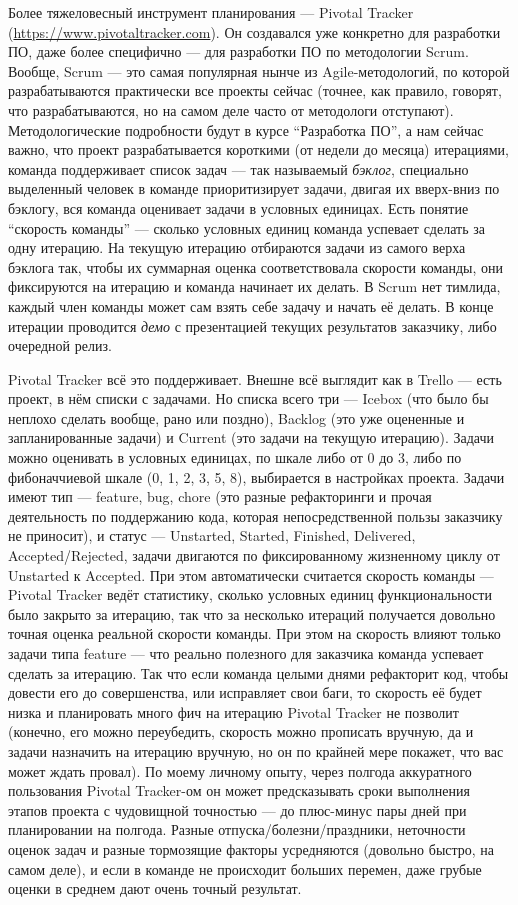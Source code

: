 \documentclass[a5paper]{article}
\begin{document}
Более тяжеловесный инструмент планирования --- Pivotal Tracker (\url{https://www.pivotaltracker.com}). Он создавался уже конкретно для разработки ПО, даже более специфично --- для разработки ПО по методологии Scrum. Вообще, Scrum --- это самая популярная нынче из Agile-методологий, по которой разрабатываются практически все проекты сейчас (точнее, как правило, говорят, что разрабатываются, но на самом деле часто от методологи отступают). Методологические подробности будут в курсе ``Разработка ПО'', а нам сейчас важно, что проект разрабатывается короткими (от недели до месяца) итерациями, команда поддерживает список задач --- так называемый \textit{бэклог}, специально выделенный человек в команде приоритизирует задачи, двигая их вверх-вниз по бэклогу, вся команда оценивает задачи в условных единицах. Есть понятие ``скорость команды'' --- сколько условных единиц команда успевает сделать за одну итерацию. На текущую итерацию отбираются задачи из самого верха бэклога так, чтобы их суммарная оценка соответствовала скорости команды, они фиксируются на итерацию и команда начинает их делать. В Scrum нет тимлида, каждый член команды может сам взять себе задачу и начать её делать. В конце итерации проводится \textit{демо} с презентацией текущих результатов заказчику, либо очередной релиз.

Pivotal Tracker всё это поддерживает. Внешне всё выглядит как в Trello --- есть проект, в нём списки с задачами. Но списка всего три --- Icebox (что было бы неплохо сделать вообще, рано или поздно), Backlog (это уже оцененные и запланированные задачи) и Current (это задачи на текущую итерацию). Задачи можно оценивать в условных единицах, по шкале либо от 0 до 3, либо по фибоначчиевой шкале (0, 1, 2, 3, 5, 8), выбирается в настройках проекта. Задачи имеют тип --- feature, bug, chore (это разные рефакторинги и прочая деятельность по поддержанию кода, которая непосредственной пользы заказчику не приносит), и статус --- Unstarted, Started, Finished, Delivered, Accepted/Rejected, задачи двигаются по фиксированному жизненному циклу от Unstarted к Accepted. При этом автоматически считается скорость команды --- Pivotal Tracker ведёт статистику, сколько условных единиц функциональности было закрыто за итерацию, так что за несколько итераций получается довольно точная оценка реальной скорости команды. При этом на скорость влияют только задачи типа feature --- что реально полезного для заказчика команда успевает сделать за итерацию. Так что если команда целыми днями рефакторит код, чтобы довести его до совершенства, или исправляет свои баги, то скорость её будет низка и планировать много фич на итерацию Pivotal Tracker не позволит (конечно, его можно переубедить, скорость можно прописать вручную, да и задачи назначить на итерацию вручную, но он по крайней мере покажет, что вас может ждать провал). По моему личному опыту, через полгода аккуратного пользования Pivotal Tracker-ом он может предсказывать сроки выполнения этапов проекта с чудовищной точностью --- до плюс-минус пары дней при планировании на полгода. Разные отпуска/болезни/праздники, неточности оценок задач и разные тормозящие факторы усредняются (довольно быстро, на самом деле), и если в команде не происходит больших перемен, даже грубые оценки в среднем дают очень точный результат.
\end{document}
